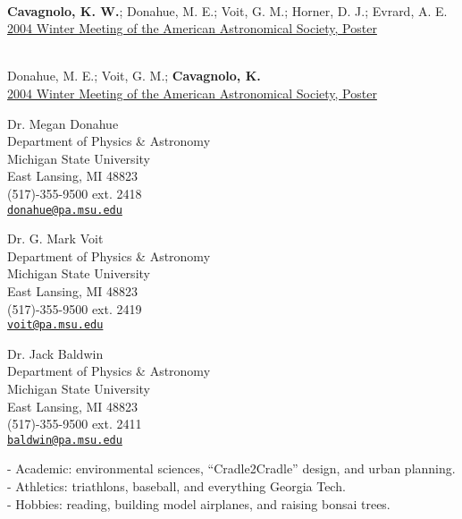 \documentclass[11pt]{cv}
\begin{document}
\begin{llist}
{}\\
{\bf Cavagnolo, K. W.}; Donahue, M. E.; Voit, G. M.; Horner, D. J.; Evrard, A. E.\\
\href{http://adsabs.harvard.edu/abs/2004AAS...20514715C}{2004 Winter
Meeting of the American Astronomical Society, Poster}

{}\\
Donahue, M. E.; Voit, G. M.; {\bf Cavagnolo, K.}\\
\href{http://adsabs.harvard.edu/abs/2004AAS...205.6020D}{2004 Winter
Meeting of the American Astronomical Society, Poster}



{\sc Dr. Megan Donahue}\\
Department of Physics \& Astronomy\\
Michigan State University\\
East Lansing, MI 48823\\
(517)-355-9500 ext. 2418\\
\href{mailto:donahue@pa.msu.edu}{\tt donahue@pa.msu.edu}

{\sc Dr. G. Mark Voit}\\
Department of Physics \& Astronomy\\
Michigan State University\\
East Lansing, MI 48823\\
(517)-355-9500 ext. 2419\\
\href{mailto:voit@pa.msu.edu}{\tt voit@pa.msu.edu}

{\sc Dr. Jack Baldwin}\\
Department of Physics \& Astronomy\\
Michigan State University\\
East Lansing, MI 48823\\
(517)-355-9500 ext. 2411\\
\href{mailto:baldwin@pa.msu.edu}{\tt baldwin@pa.msu.edu}


- Academic: environmental sciences, ``Cradle2Cradle'' design, and urban planning.\\
- Athletics: triathlons, baseball, and everything Georgia Tech.\\
- Hobbies: reading, building model airplanes, and raising bonsai trees.\\

\end{llist}
\end{document}
